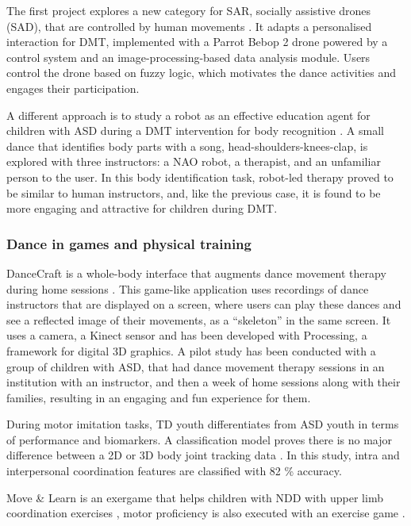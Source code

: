 \documentclass[a4paper,fleqn]{cas-sc}
\begin{document}
The first project explores a new category for SAR, socially assistive drones (SAD), that are controlled by human movements \cite{Ascensao22}. It adapts a personalised interaction for DMT, implemented with a Parrot Bebop 2 drone powered by a control system and an image-processing-based data analysis module. Users control the drone based on fuzzy logic, which motivates the dance activities and engages their participation.

A different approach is to study a robot as an effective education agent for children with ASD during a DMT intervention for body recognition \cite{Suzuki17}. A small dance that identifies body parts with a song, head-shoulders-knees-clap, is explored with three instructors: a NAO robot, a therapist, and an unfamiliar person to the user. In this body identification task, robot-led therapy proved to be similar to human instructors, and, like the previous case, it is found to be more engaging and attractive for children during DMT.



\subsubsection{Dance in games and physical training}  %

DanceCraft is a whole-body interface that augments dance movement therapy during home sessions \cite{Ringland19}. This game-like application uses recordings of dance instructors that are displayed on a screen, where users can play these dances and see a reflected image of their movements, as a ``skeleton'' in the same screen. It uses a camera, a Kinect sensor and has been developed with Processing, a framework for digital 3D graphics. A pilot study has been conducted with a group of children with ASD, that had dance movement therapy sessions in an institution with an instructor, and then a week of home sessions along with their families, resulting in an engaging and fun experience for them.

During motor imitation tasks, TD youth differentiates from ASD youth in terms of performance and biomarkers. A classification model proves there is no major difference between a 2D or 3D body joint tracking data \cite{Zampella21}. In this study, intra and interpersonal coordination features are classified with 82 \% accuracy.

Move \& Learn is an exergame that helps children with NDD with upper limb coordination exercises \cite{Raygoza-Romero21}, motor proficiency is also executed with an exercise game  \cite{Hocking22}.
\end{document}
